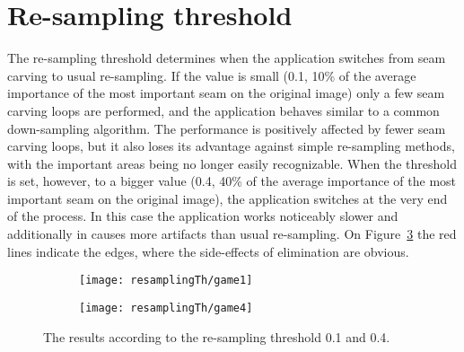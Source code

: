 \documentclass[draft,final]{vutinfth} %
\begin{document}
	\section{Re-sampling threshold}
	\label{res:resampling}
	The re-sampling threshold determines when the application switches from seam carving to usual re-sampling. 
	If the value is small (0.1, 10\% of the average importance of the most important seam on the original image) only a few seam carving loops are performed, and the application behaves similar to a common down-sampling algorithm.
	The performance is positively affected by fewer seam carving loops, but it also loses its advantage against simple re-sampling methods, with the important areas being no longer easily recognizable.
	When the threshold is set, however, to a bigger value (0.4, 40\% of the average importance of the most important seam on the original image), the application switches at the very end of the process.
	In this case the application works noticeably slower and additionally in causes more artifacts than usual re-sampling.
	On Figure~\ref{fig:res} the red lines indicate the edges, where the side-effects of elimination are obvious.
	\begin{figure}[H]
		\centering
		\begin{subfigure}[b]{0.45\columnwidth}
			\centering
			\texttt{[image: resamplingTh/game1]}
			\label{fig:res:th1}
		\end{subfigure}
		\begin{subfigure}[b]{0.45\columnwidth}
			\centering
			\texttt{[image: resamplingTh/game4]}
			\label{fig:res:th2}
		\end{subfigure}
		\caption{The results according to the re-sampling threshold 0.1 and 0.4.}
		\label{fig:res}
	\end{figure}  
\end{document}
